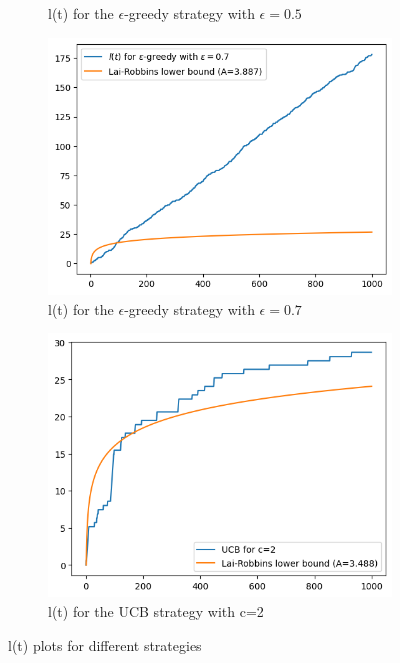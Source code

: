 \begin{figure}[ht]
\begin{subfigure}{0.45\textwidth}
        \caption{l(t) for the $\epsilon$-greedy strategy with $\epsilon=0.5$}
    \end{subfigure} 
    \begin{subfigure}{0.45\textwidth}
        \centering
        \includegraphics[scale=0.45]{figures/e07.png}
        \caption{l(t) for the $\epsilon$-greedy strategy with $\epsilon=0.7$}
    \end{subfigure} 
    \begin{subfigure}{0.45\textwidth}
        \centering
        \includegraphics[scale=0.45]{figures/ucb.png}
        \caption{l(t) for the UCB strategy with c=2}
    \end{subfigure}
    \caption{l(t) plots for different strategies}
    \label{fig:plots}
\end{figure}


